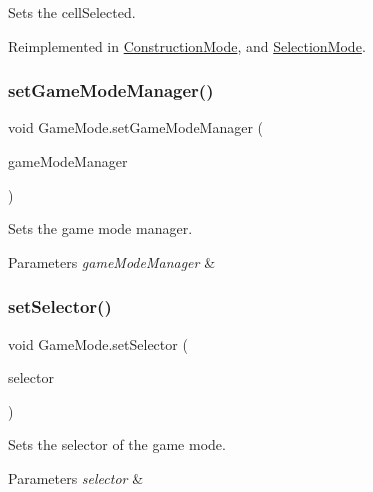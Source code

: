 Sets the cell\+Selected. 



Reimplemented in \mbox{\hyperlink{class_construction_mode_a4668815afe087d0cea35f8c7144e47f9}{Construction\+Mode}}, and \mbox{\hyperlink{class_selection_mode_a2abd35e0ae4625320cb5ee5b35e3d759}{Selection\+Mode}}.

\mbox{\label{class_game_mode_adfc4880129481cdc7012440d977d4ea5}} 
\subsubsection{\texorpdfstring{set\+Game\+Mode\+Manager()}{setGameModeManager()}}
{\footnotesize\ttfamily void Game\+Mode.\+set\+Game\+Mode\+Manager (\begin{DoxyParamCaption}\item[{\mbox{\hyperlink{class_player}{Player}}}]{game\+Mode\+Manager }\end{DoxyParamCaption})}



Sets the game mode manager. 


\begin{DoxyParams}{Parameters}
{\em game\+Mode\+Manager} & \\
\hline
\end{DoxyParams}
\mbox{\label{class_game_mode_a935569fe49afce6c4778b58fee12620c}} 
\subsubsection{\texorpdfstring{set\+Selector()}{setSelector()}}
{\footnotesize\ttfamily void Game\+Mode.\+set\+Selector (\begin{DoxyParamCaption}\item[{Game\+Object}]{selector }\end{DoxyParamCaption})}



Sets the selector of the game mode. 


\begin{DoxyParams}{Parameters}
{\em selector} & \\
\hline
\end{DoxyParams}
\mbox{\label{class_game_mode_a6c6008ded1f901492808039a45b7a3af}} 
